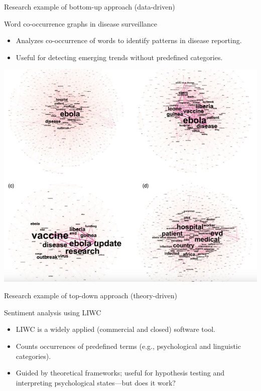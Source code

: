 \documentclass[handout]{beamer}
\begin{document}
\begin{frame}{Research example of bottom-up approach (data-driven)}

    \begin{block}{Word co-occurrence graphs in disease surveillance}
        \begin{itemize}
            \item Analyzes co-occurrence of words to identify patterns in disease reporting.
            \item Useful for detecting emerging trends without predefined categories.
        \end{itemize}
        \begin{center}
            \includegraphics[width=0.4\linewidth]{../pictures/wordcloud.png}
            \small \cite{you2021using} %
        \end{center}
    \end{block}

\end{frame}


\begin{frame}{Research example of top-down approach (theory-driven)}
    \begin{block}{Sentiment analysis using LIWC}
        \begin{itemize}
            \item LIWC is a widely applied (commercial and closed) software tool.
            \item Counts occurrences of predefined terms (e.g., psychological and linguistic categories).
            \item Guided by theoretical frameworks; useful for hypothesis testing and interpreting psychological states—but does it work?
        \end{itemize}
    \end{block}
    \vspace{0.5cm}
    \small \cite{tausczik2010psychological} %
\end{frame}
\end{document}

